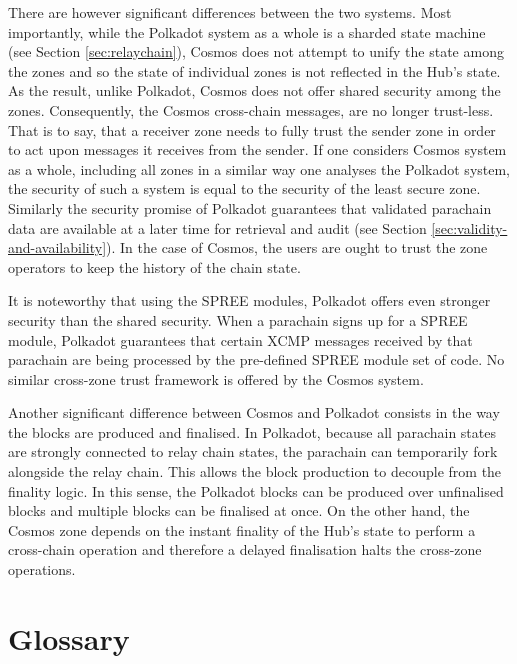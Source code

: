 \documentclass{article}
\begin{document}
\begin{appendix}
There are however significant differences between the two systems. Most importantly, while the Polkadot system as a whole is a sharded state machine (see Section \ref{sec:relaychain}), Cosmos does not attempt to unify the state among the zones and so the state of individual zones is not reflected in the Hub's state. As the result, unlike Polkadot, Cosmos does not offer shared security among the zones. Consequently, the Cosmos cross-chain messages, are no longer trust-less. That is to say, that a receiver zone needs to fully trust the sender zone in order to act upon messages it receives from the sender. If one considers Cosmos system as a whole, including all zones in a similar way one analyses the Polkadot system, the security of such a system is equal to the security of the least secure zone. Similarly the security promise of Polkadot guarantees that validated parachain data are available at a later time for retrieval and audit (see Section \ref{sec:validity-and-availability}). In the case of Cosmos, the users are ought to trust the zone operators to keep the history of the chain state.

It is noteworthy that using the SPREE modules, Polkadot offers even stronger security than the shared security.
When a parachain signs up for a SPREE module, Polkadot guarantees that certain XCMP messages received by that parachain are being processed by the pre-defined SPREE module set of code. No similar cross-zone trust framework is offered by the Cosmos system.

Another significant difference between Cosmos and Polkadot consists in the way the blocks are produced and finalised. In Polkadot, because all parachain states are strongly connected to relay chain states, the parachain can temporarily fork alongside the relay chain. This allows the block production to decouple from the finality logic. In this sense, the Polkadot blocks can be produced over unfinalised blocks and multiple blocks can be finalised at once. On the other hand, the Cosmos zone depends on the instant finality of the Hub's state to perform a cross-chain operation and therefore a delayed finalisation halts the cross-zone operations.



\section{Glossary}




\end{appendix}
\end{document}
